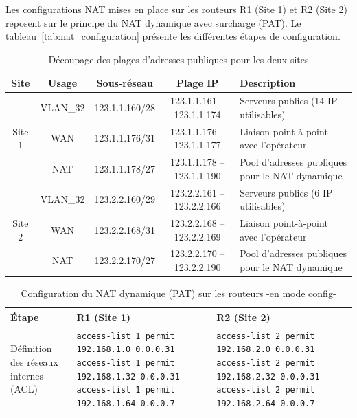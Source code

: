 \documentclass[12pt,a4paper, oneside]{memoir}
\begin{document}
Les configurations NAT mises en place sur les routeurs R1 (Site 1) et R2 (Site 2) reposent sur le principe du NAT dynamique avec surcharge (PAT). Le tableau~\ref{tab:nat_configuration} présente les différentes étapes de configuration.
\begin{landscape}
	\begin{table}[H]
		\centering
		\caption{Découpage des plages d’adresses publiques pour les deux sites}
		\renewcommand{\arraystretch}{1.2}
		\begin{tabular}{|c|c|c|c|p{10cm}|}
			\hline
			\textbf{Site} & \textbf{Usage} & \textbf{Sous-réseau} & \textbf{Plage IP} & \textbf{Description} \\
			\hline
			
			\multirow{3}{*}{Site 1} 
			& VLAN\_32 & 123.1.1.160/28 & 123.1.1.161 -- 123.1.1.174 & Serveurs publics (14 IP utilisables) \\
			\cline{2-5}
			& WAN & 123.1.1.176/31 & 123.1.1.176 -- 123.1.1.177 & Liaison point-à-point avec l’opérateur \\
			\cline{2-5}
			& NAT & 123.1.1.178/27 & 123.1.1.178 -- 123.1.1.190 & Pool d’adresses publiques pour le NAT dynamique \\
			
			\hline
			\hline
			
			\multirow{3}{*}{Site 2} 
			& VLAN\_32 & 123.2.2.160/29 & 123.2.2.161 -- 123.2.2.166 & Serveurs publics (6 IP utilisables) \\
			\cline{2-5}
			& WAN & 123.2.2.168/31 & 123.2.2.168 -- 123.2.2.169 & Liaison point-à-point avec l’opérateur \\
			\cline{2-5}
			& NAT & 123.2.2.170/27 & 123.2.2.170 -- 123.2.2.190 & Pool d’adresses publiques pour le NAT dynamique \\
			
			\hline
		\end{tabular}
		\label{tab:decoupage_plages_publiques}
	\end{table}
	
\begin{table}[H]
	\centering
	\caption{Configuration du NAT dynamique (PAT) sur les routeurs -en mode config-}
	\renewcommand{\arraystretch}{1.3}
	\begin{tabular}{|p{3cm}|p{10.3cm}|p{10.3cm}|}
		\hline
		\textbf{Étape} & \textbf{R1 (Site 1)} & \textbf{R2 (Site 2)} \\
		\hline
		
		Définition des réseaux internes (ACL) 
		& 
		\texttt{access-list 1 permit 192.168.1.0 0.0.0.31} \newline 
		\texttt{access-list 1 permit 192.168.1.32 0.0.0.31} \newline 
		\texttt{access-list 1 permit 192.168.1.64 0.0.0.7}
		&
		\texttt{access-list 2 permit 192.168.2.0 0.0.0.31} \newline
		\texttt{access-list 2 permit 192.168.2.32 0.0.0.31} \newline 
		\texttt{access-list 2 permit 192.168.2.64 0.0.0.7}
		\\
		\hline
		

\end{tabular}
\end{table}
\end{landscape}
\end{document}
